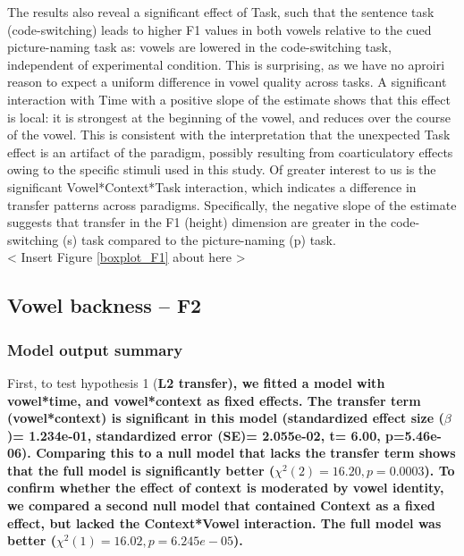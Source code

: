 \documentclass[12 pt]{article}
\begin{document}
The results also reveal a significant effect of Task, such that the sentence task (code-switching) leads to higher F1 values in both vowels relative to the cued picture-naming task as: vowels are lowered in the code-switching task, independent of experimental condition. This is surprising, as we have no aproiri reason to expect a uniform difference in vowel quality across tasks. A significant interaction with Time with a positive slope of the estimate shows that this effect is local: it is strongest at the beginning of the vowel, and reduces over the course of the vowel. This is consistent with the interpretation that the unexpected Task effect is an artifact of the paradigm, possibly resulting from coarticulatory effects owing to the specific stimuli used in this study. Of greater interest to us is the significant Vowel*Context*Task interaction, which indicates a difference in transfer patterns across paradigms. Specifically, the negative slope of the estimate suggests that transfer in the F1 (height) dimension are greater in the code-switching (s) task compared to the picture-naming (p) task.\\


< Insert Figure \ref{boxplot_F1} about here >\\


\subsection{Vowel backness -- F2}

\subsubsection*{Model output summary}

First, to test hypothesis 1 (\bf{L2 transfer}), we fitted a model with vowel*time, and vowel*context as fixed effects. The transfer term (vowel*context) is significant in this model (standardized effect size ($\beta$)= 1.234e-01, standardized error (SE)=  2.055e-02, t= 6.00, p=5.46e-06). Comparing this to a null model that lacks the transfer term shows that the full model is significantly better ($\chi^2(2) = 16.20, p= 0.0003$). To confirm whether the effect of context is moderated by vowel identity, we compared a second null model that contained Context as a fixed effect, but lacked the Context*Vowel interaction. The full model was better ($\chi^2(1) = 16.02, p= 6.245e-05$).
  
\end{document}
